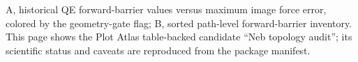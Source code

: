 A, historical QE forward-barrier values versus maximum image force error, colored by the geometry-gate flag; B, sorted path-level forward-barrier inventory. This page shows the Plot Atlas table-backed candidate ``Neb topology audit''; its scientific status and caveats are reproduced from the package manifest.
